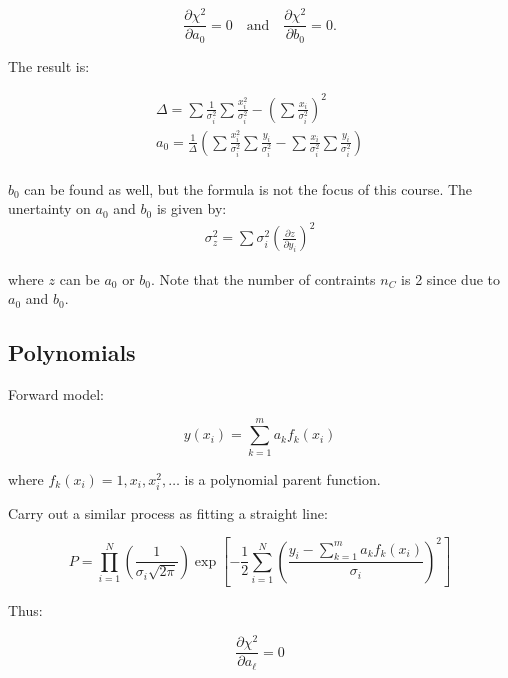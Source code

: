 \vsp
\begin{equation*}
    \frac{\partial \chi^2}{\partial a_0} = 0 \quad \text{and} \quad \frac{\partial \chi^2}{\partial b_0} = 0\text{.}
\end{equation*}

The result is:

\begin{align*}
    \Delta = \sum \frac{1}{\sigma_i^2} \sum \frac{x_i^2}{\sigma_i^2} - \left(\sum \frac{x_i}{\sigma_i^2}\right)^2                                             \\
    a_0 = \frac{1}{\Delta} \left( \sum \frac{x_i^2}{\sigma_i^2} \sum \frac{y_i}{\sigma_i^2} - \sum \frac{x_i}{\sigma_i^2} \sum \frac{y_i}{\sigma_i^2} \right) \\
\end{align*}

$b_0$ can be found as well, but the formula is not the focus of this course.
\vsp
The unertainty on $a_0$ and $b_0$ is given by:
\begin{align*}
    \sigma_z^2 = \sum \sigma_i^2 \left(\frac{\partial z}{\partial y_i}\right)^2
\end{align*}

where $z$ can be $a_0$ or $b_0$. Note that the number of contraints $n_C$ is 2 since due to $a_0$ and $b_0$.

\subsection{Polynomials}

Forward model:

\begin{equation*}
    y(x_i) = \sum_{k=1}^m a_k f_k(x_i)
\end{equation*}

where $f_k(x_i) = 1, x_i, x_i^2, \dots$ is a polynomial parent function.

\vsp
Carry out a similar process as fitting a straight line:

\begin{equation*}
    P = \prod_{i=1}^{N}\left(\frac{1}{ \sigma_i \sqrt{2\pi}}\right) \exp\left[-\frac{1}{2}\sum_{i=1}^{N}\left(\frac{y_i - \sum_{k=1}^m a_k f_k(x_i)}{\sigma_i}\right)^2\right]
\end{equation*}

Thus:

\begin{equation*}
    \frac{\partial \chi^2}{\partial a_\ell} = 0 \tag*{for $\ell = 1, \dots, m$}
\end{equation*}